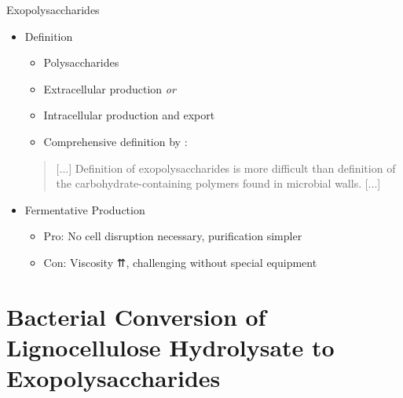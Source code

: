\documentclass[mathserif]{beamer}
\newcommand{\LCH}{Lignocellulose Hydrolysate}
\newcommand{\EPS}{Exopolysaccharide}
\newcommand{\eps}{exopolysaccharide}
\newcommand{\chc}{car\-bo\-hy\-drate-con\-tai\-ning}
\begin{document}
\begin{frame}{\EPS{}s}
	\begin{itemize}
		\item Definition
			\begin{itemize}
				\item Polysaccharides
				\pause
				\item Extracellular production \textit{or}
				\item Intracellular production and export
				\pause
				\item Comprehensive definition by \textcite{Sutherland1990}:
			\end{itemize}
			\pause
			\begin{quote}
				[...] Definition of \eps{}s is more difficult than definition of the \chc{} polymers found in microbial walls. [...]
			\end{quote}
		\pause
		\item Fermentative Production
			\begin{itemize}
				\item Pro: No cell disruption necessary, purification simpler
				\pause
				\item Con: Viscosity ⇈, challenging without special equipment
			\end{itemize}
	\end{itemize}
\end{frame}

\section{Bacterial Conversion of \LCH{} to \EPS{}s}
\end{document}
